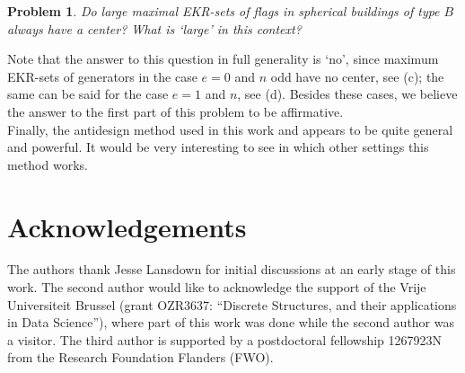 \documentclass[11pt]{article}
\newtheorem{problem}[thm]{Problem}
\begin{document}
\begin{problem}
    Do large maximal EKR-sets of flags in spherical buildings of type $B$ always have a center? What is `large' in this context?
\end{problem}

Note that the answer to this question in full generality is `no', since maximum EKR-sets of generators in the case $e = 0$ and $n$ odd have no center, see  (c); the same can be said for the case $e=1$ and $n$, see  (d). %
Besides these cases, we believe the answer to the first part of this problem to be affirmative. \\

Finally, the antidesign method used in this work and \cite{klaus_jesse_philipp} appears to be quite general and powerful. It would be very interesting to see in which other settings this method works.

\section*{Acknowledgements}

The authors thank Jesse Lansdown for initial discussions at an early stage of this work.
The second author would like to acknowledge the support of the Vrije Universiteit Brussel 
(grant OZR3637: ``Discrete Structures, and their applications in Data Science''), where part of this work was done while the second author was a visitor. The third author is supported by a postdoctoral fellowship 1267923N from the Research Foundation Flanders (FWO).






\end{document}
